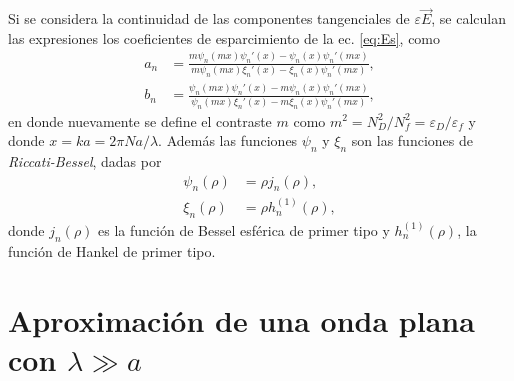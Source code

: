 \documentclass[letterpaper, 12pt] {article}
\begin{document}
Si se considera la continuidad de las componentes tangenciales de $\varepsilon \vec{E}$, se calculan las expresiones los coeficientes de esparcimiento de la ec. \eqref{eq:Es}, como
\begin{align}
a_n &= \frac{m\psi_n(mx)\psi_n'(x)-\psi_n(x)\psi_n' (mx)}{m\psi_n(mx)\xi_n'(x)-\xi_n(x)\psi_n'(mx)}, \label{eq:an}\\
b_n &= \frac{\psi_n(mx)\psi_n'(x)-m\psi_n(x)\psi_n' (mx)}{\psi_n(mx)\xi_n'(x)-m\xi_n(x)\psi_n'(mx)}, \label{eq:bn}
\end{align}
en donde nuevamente se define el contraste $m$ como $m^2 = N_D^2/N_f^2 = \varepsilon_D/\varepsilon_f$ y donde $x = k a = 2\pi Na/\lambda$. Además las funciones $\psi_n$ y $\xi_n$ son las funciones de \emph{Riccati-Bessel}, dadas por
\begin{align}
\psi_n (\rho) &= \rho j_n (\rho),\label{eq:psi}\\
\xi_n (\rho) &= \rho h_n ^{(1)}(\rho)\label{eq:xi},
\end{align}
donde $j_n(\rho)$ es la función de Bessel esférica de primer tipo y $h_n^{(1)}(\rho)$, la función de Hankel de primer tipo.
\section{Aproximación de una onda plana con $\lambda\gg a$}
\end{document}
